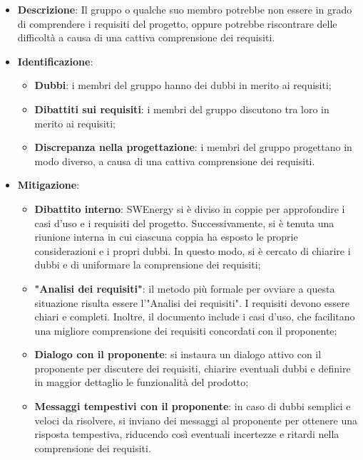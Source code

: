 \label{risk:comprensione dei requisiti carente}
\begin{itemize}
	\item \textbf{Descrizione}:
	      Il gruppo o qualche suo membro potrebbe non essere in grado di
	      comprendere i requisiti del progetto, oppure potrebbe riscontrare
	      delle difficoltà a causa di una cattiva comprensione dei requisiti.
	\item \textbf{Identificazione}:
	      \begin{itemize}
		      \item \textbf{Dubbi}: i membri del gruppo hanno dei dubbi in merito ai
		            requisiti;

		      \item \textbf{Dibattiti sui requisiti}: i membri del gruppo
		            discutono tra loro in merito ai requisiti;

		      \item \textbf{Discrepanza nella progettazione}: i membri del
		            gruppo progettano in modo diverso, a causa di una cattiva
		            comprensione dei requisiti.
	      \end{itemize}

	\item \textbf{Mitigazione}:
	      \begin{itemize}
		      \item \textbf{Dibattito interno}: SWEnergy si è diviso in coppie
		            per approfondire i casi d'uso e i requisiti del progetto.
		            Successivamente, si è tenuta una riunione interna in cui ciascuna coppia
		            ha esposto  le proprie considerazioni e i propri dubbi. In
		            questo modo, si è cercato di chiarire i dubbi e di
		            uniformare la comprensione dei requisiti;

		      \item \textbf{"Analisi dei requisiti"}: il metodo più formale per
		            ovviare a questa situazione risulta essere
		            l'"Analisi dei requisiti".
		            I requisiti devono essere chiari e completi. Inoltre, il documento 
					include i casi d’uso, che facilitano una migliore comprensione 
					dei requisiti concordati con il proponente;

		      \item \textbf{Dialogo con il proponente}: si instaura un dialogo attivo 
			  con il proponente per discutere dei requisiti, chiarire eventuali dubbi 
			  e definire in maggior dettaglio le funzionalità del prodotto;

		      \item \textbf{Messaggi tempestivi con il proponente}: in caso di dubbi
		            semplici e veloci da risolvere, si inviano dei messaggi al
		            proponente per ottenere una risposta tempestiva, riducendo così 
					eventuali incertezze e ritardi nella comprensione dei requisiti.
	      \end{itemize}
\end{itemize}
